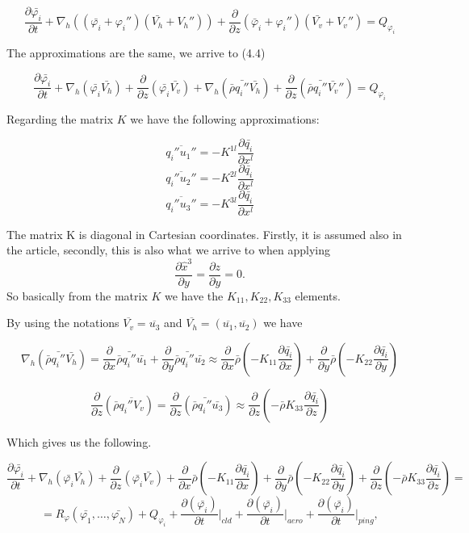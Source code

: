 \documentclass{article}
\begin{document}
\[ \frac{\partial \bar{\varphi_i} }{\partial t} + \nabla_{h} ((\bar{\varphi_i} + \varphi_i '')(\bar{V_{h}} + V_{h}'')) + \frac{\partial}{\partial z}(\bar{\varphi}_i + \varphi_i '')(\bar{V_{v}} + V_{v}'') = Q_{\varphi_i}\]

The approximations are the same, we arrive to (4.4)

\[ \frac{\partial \bar{\varphi_i}}{\partial t}  + \nabla_{h} (\bar{\varphi_i} \bar{V_h}) + \frac{\partial}{\partial z} (\bar{\varphi_i} \bar{V_v}) + \nabla_h (\bar{\rho }\bar{q_i ''} \bar{V_h}) + \frac{\partial}{\partial z} (\bar{\rho} \bar{q_i ''} \bar{V_v}'') = Q_{\varphi_i} \]

Regarding the matrix $K$ we have the following approximations:

\[ \overline{q_i'' u_1''} = -K^{1l} \frac{\partial \bar{q_i}}{\partial x^l}\]  \[ \overline{q_i'' u_2''} = -K^{2l} \frac{\partial \bar{q_i}}{\partial x^l} \] \[ \overline{q_i'' u_3''} = -K^{3l} \frac{\partial \bar{q_i}}{\partial x^l}\]

The matrix K is diagonal in Cartesian coordinates. Firstly, it is assumed also in the article, secondly, this is also what we arrive to when applying $$ \frac{\partial \hat{x}^3}{\partial y} = \frac{\partial z}{\partial y} = 0.$$ So basically from the matrix $K$ we have the $K_{11}, K_{22}, K_{33}$ elements.

By using the notations $\overline{V_v} = \overline{u_3}$ and $\overline{V_h} = (\overline{u_1}, \overline{u_2})$ we have

\[ \nabla_h (\bar{\rho }\bar{q_i ''} \bar{V_h}) = \frac{\partial}{\partial x} \bar{\rho} \bar{q_i ''} \bar{u_1} + \frac{\partial}{\partial y} \bar{\rho} \bar{q_i ''} \bar{u_2} \approx \frac{\partial}{\partial x} \bar{\rho} (-K_{11} \frac{\partial \bar{q_i}}{\partial x}) + \frac{\partial}{\partial y} \bar{\rho} (-K_{22} \frac{\partial \bar{q_i}}{\partial y})\]

 \[ \frac{\partial}{\partial z} (\bar{\rho} \overline{q_i '' V_v}) = \frac{\partial}{\partial z} (\bar{\rho} \bar{q_i ''} \bar{u_3}) \approx \frac{\partial}{\partial z} (- \bar{\rho} K_{33} \frac{\partial \bar{q_i}}{\partial z}) \]
 
 Which gives us the following.
 
 \[ \frac{\partial \bar{\varphi_i}}{\partial t}  + \nabla_{h} (\bar{\varphi_i} \bar{V_h}) + \frac{\partial}{\partial z} (\bar{\varphi_i} \bar{V_v}) + \frac{\partial}{\partial x} \bar{\rho} (-K_{11} \frac{\partial \bar{q_i}}{\partial x}) + \frac{\partial}{\partial y} \bar{\rho} (-K_{22} \frac{\partial \bar{q_i}}{\partial y}) + \frac{\partial}{\partial z} (- \bar{\rho} K_{33} \frac{\partial \bar{q_i}}{\partial z}) = \]
 \[ = R_{\varphi} (\bar{\varphi_1}, \dots , \bar{\varphi_N}) + Q_{\varphi_i} + \frac{\partial (\bar{\varphi_i})}{\partial t} \rvert_{cld} + \frac{\partial (\bar{\varphi_i})}{\partial t} \rvert_{aero} + \frac{\partial (\bar{\varphi_i})}{\partial t} \rvert_{ping},\]
 
\end{document}
